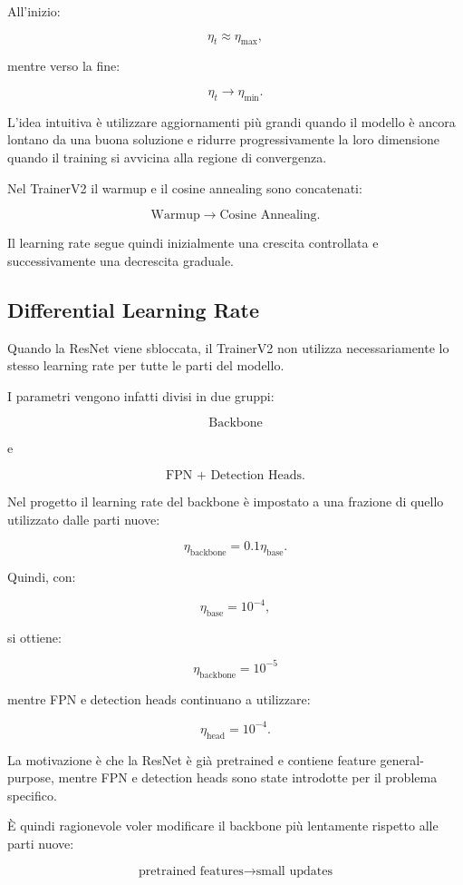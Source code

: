 All'inizio:

\[
\eta_t \approx \eta_{\max},
\]

mentre verso la fine:

\[
\eta_t \rightarrow \eta_{\min}.
\]

L'idea intuitiva è utilizzare aggiornamenti più grandi quando il modello è
ancora lontano da una buona soluzione e ridurre progressivamente la loro
dimensione quando il training si avvicina alla regione di convergenza.

Nel TrainerV2 il warmup e il cosine annealing sono concatenati:

\[
\text{Warmup}
\rightarrow
\text{Cosine Annealing}.
\]

Il learning rate segue quindi inizialmente una crescita controllata e
successivamente una decrescita graduale.

\subsection{Differential Learning Rate}

Quando la ResNet viene sbloccata, il TrainerV2 non utilizza necessariamente lo
stesso learning rate per tutte le parti del modello.

I parametri vengono infatti divisi in due gruppi:

\[
\text{Backbone}
\]

e

\[
\text{FPN + Detection Heads}.
\]

Nel progetto il learning rate del backbone è impostato a una frazione di quello
utilizzato dalle parti nuove:

\[
\eta_{\text{backbone}}
=
0.1\eta_{\text{base}}.
\]

Quindi, con:

\[
\eta_{\text{base}}=10^{-4},
\]

si ottiene:

\[
\eta_{\text{backbone}}=10^{-5}
\]

mentre FPN e detection heads continuano a utilizzare:

\[
\eta_{\text{head}}=10^{-4}.
\]

La motivazione è che la ResNet è già pretrained e contiene feature
general-purpose, mentre FPN e detection heads sono state introdotte per il
problema specifico.

È quindi ragionevole voler modificare il backbone più lentamente rispetto
alle parti nuove:

\[
\text{pretrained features}
\rightarrow
\text{small updates}
\]

